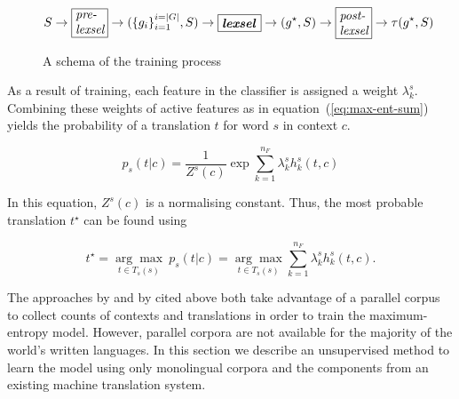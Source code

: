 \documentclass[11pt]{article}
\begin{document}
\begin{figure*}
\begin{displaymath}
  \label{eq:steps}
  S \to \mbox{\framebox{\parbox{0.8cm}{\textit{pre- lexsel}}}} \to (\{g_i\}_{i=1}^{i=|G|},S) \to \mbox{\framebox{\parbox{1.0cm}{\textit{\textbf{lexsel}}}}} \to (g^\star,S) \to \mbox{\framebox{\parbox{0.8cm}{\textit{post- lexsel}}}} \to \tau(g^\star,S)
\end{displaymath}
 \caption{A schema of the training process}
 \label{fig:lexselschema}
\end{figure*}


As a result of training, each feature in the classifier is assigned a
weight $\lambda_k^s$. Combining these weights of active features
as in equation~(\ref{eq:max-ent-sum}) yields the probability of a
translation $t$ for word $s$ in context $c$.

\begin{equation}
p_s(t|c) = \frac{1}{Z^s(c)} \exp{ \sum_{k=1}^{n_F} \lambda_k^s h_k^s(t, c)}
\label{eq:max-ent-sum}
\end{equation}

In this equation, $Z^s(c)$ is a normalising constant. Thus, the most
probable translation \(t^\star\) can be found using

\begin{equation}
  t^\star=\underset{t \in T_s(s)}{\arg\max} ~ p_s(t|c) = \underset{t \in T_s(s)}{\arg\max} \sum_{k=1}^{n_F} \lambda_k^s h_k^s(t, c) .
\label{eq:max-ent-max}
\end{equation}


The approaches by \cite{berger1996} and by \cite{marechek10} cited
above both take advantage of a parallel corpus to collect counts of
contexts and translations in order to train the maximum-entropy
model. However, parallel corpora are not available for the majority of
the world's written languages. In this section we describe an
unsupervised method to learn the model using only monolingual corpora
and the components from an existing machine translation system.
\end{document}
